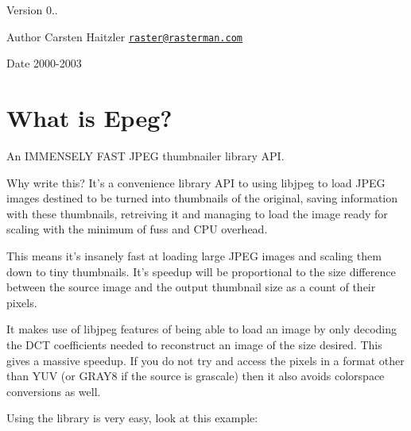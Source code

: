  \begin{DoxyVersion}{Version}
0.. 
\end{DoxyVersion}
\begin{DoxyAuthor}{Author}
Carsten Haitzler \href{mailto:raster@rasterman.com}{\tt raster@rasterman.\+com} 
\end{DoxyAuthor}
\begin{DoxyDate}{Date}
2000-\/2003
\end{DoxyDate}
\hypertarget{index_intro}{}\section{What is Epeg?}\label{index_intro}
An I\+M\+M\+E\+N\+S\+E\+L\+Y F\+A\+S\+T J\+P\+E\+G thumbnailer library A\+P\+I.

Why write this? It's a convenience library A\+P\+I to using libjpeg to load J\+P\+E\+G images destined to be turned into thumbnails of the original, saving information with these thumbnails, retreiving it and managing to load the image ready for scaling with the minimum of fuss and C\+P\+U overhead.

This means it's insanely fast at loading large J\+P\+E\+G images and scaling them down to tiny thumbnails. It's speedup will be proportional to the size difference between the source image and the output thumbnail size as a count of their pixels.

It makes use of libjpeg features of being able to load an image by only decoding the D\+C\+T coefficients needed to reconstruct an image of the size desired. This gives a massive speedup. If you do not try and access the pixels in a format other than Y\+U\+V (or G\+R\+A\+Y8 if the source is grascale) then it also avoids colorspace conversions as well.

Using the library is very easy, look at this example\+:




